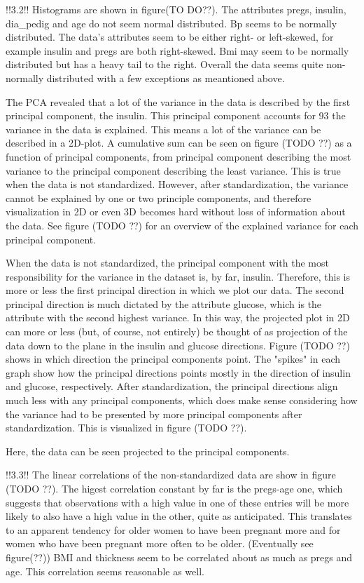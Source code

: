 !!3.2!!
Histograms are shown in figure(TO DO??). The attributes pregs, insulin, dia_pedig
and age do not seem normal distributed. Bp seems to be normally distributed.
The data's attributes seem to be either right- or left-skewed, for example insulin and pregs
are both right-skewed. Bmi may seem to be normally distributed but has a
heavy tail to the right.
Overall the data seems quite non-normally distributed with a few exceptions as meantioned above.

The PCA revealed that a lot of the variance in the data is described by the
first principal component, the insulin. This principal component accounts for
93%
the variance in the data is explained. This means a lot of the variance can
be described in a 2D-plot. A cumulative sum can be seen on figure (TODO ??) as a
function of principal components, from principal component describing the most
variance to the principal component describing the least variance. This is true
when the data is not standardized. However, after standardization, the variance
cannot be explained by one or two principle components, and therefore visualization
in 2D or even 3D becomes hard without loss of information about the data. See figure
(TODO ??) for an overview of the explained variance for each principal component.

When the data is not standardized, the principal component with the most
responsibility for the variance in the dataset is, by far, insulin. Therefore,
this is more or less the first principal direction in which we plot our data. The second
principal direction is much dictated by the attribute glucose, which is the
attribute with the second highest variance. In this way, the projected plot in
2D can more or less (but, of course, not entirely) be thought of as
projection of the data down to the plane in the insulin and glucose directions.
Figure (TODO ??) shows in which direction the principal components point. The "spikes"
in each graph show how the principal directions points mostly in the direction of
insulin and glucose, respectively. After standardization, the principal
directions align much less with any principal components, which does make sense
considering how the variance had to be presented by more principal components
after standardization. This is visualized in figure (TODO ??).

Here, the data can be seen projected to the principal components.

!!3.3!!
The linear correlations of the non-standardized data are show in figure (TODO ??).
The higest correlation constant by far is the pregs-age one, which suggests
that observations with a high value in one of these entries will be more likely
to also have a high value in the other, quite as anticipated. This translates to
an apparent tendency for older women to have been pregnant more and for women
who have been pregnant more often to be older. (Eventually see figure(??))
BMI and thickness seem to be correlated about as much as pregs and age. This
correlation seems reasonable as well.

